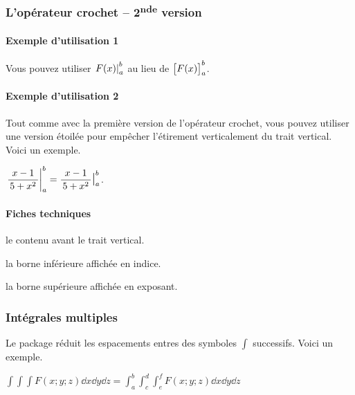 \documentclass[12pt,a4paper]{article}
\theoremstyle{definition}
\begin{document}
\subsubsection{L'opérateur crochet -- 2\textsuperscript{nde} version}

\paragraph{Exemple d'utilisation 1}

\begin{tcblisting}{}
Vous pouvez utiliser $\vhook{F(x)}{a}{b}$ au lieu de $\hook{F(x)}{a}{b}$.
\end{tcblisting}


\paragraph{Exemple d'utilisation 2}

Tout comme avec la première version de l'opérateur crochet, vous pouvez utiliser une version étoilée pour empêcher l'étirement verticalement du trait vertical. Voici un exemple.

\begin{tcblisting}{}
$\displaystyle \vhook{\frac{x - 1}{5 + x^2}}{a}{b}
             = \vhook*{\frac{x - 1}{5 + x^2}}{a}{b}$.
\end{tcblisting}


\paragraph{Fiches techniques}



 le contenu avant le trait vertical.

 la borne inférieure affichée en indice.

 la borne supérieure affichée en exposant.



\subsubsection{Intégrales multiples}

Le package réduit les espacements entres des symboles $\int$ successifs. Voici un exemple.

\begin{tcblisting}{}
$\displaystyle
  \int \int \int F(x;y;z) \dd{x} \dd{y} \dd{z}
= \int_{a}^{b} \int_{c}^{d} \int_{e}^{f} F(x;y;z) \dd{x} \dd{y} \dd{z}$
\end{tcblisting}
\end{document}
